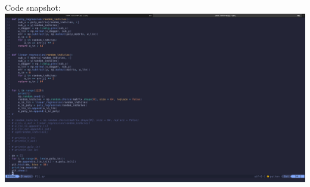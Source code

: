 \documentclass[11pt]{article}
\theoremstyle{definition}
\begin{document}
\newpage
Code snapshot: \\ 
\includegraphics[width = \textwidth]{P11snap.png} \\ 
\newpage
\end{document}
